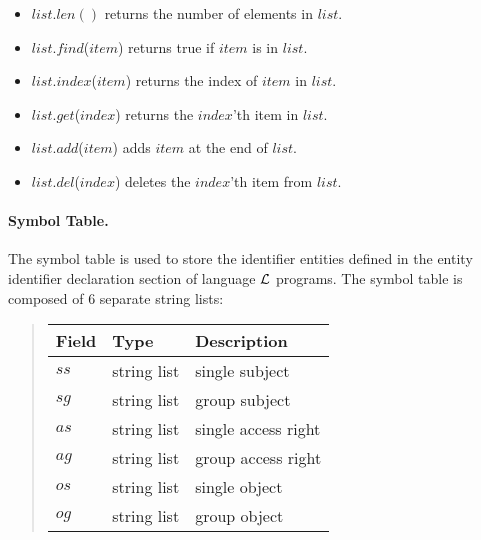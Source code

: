 \documentclass[10pt, twocolumn]{article}
\begin{document}
        \begin{itemize}
          \item
            $list.len()$
            returns the number of elements in $list$.
          \item
            $list$.$find$($item$)
            returns true if $item$ is in $list$.
          \item
            $list$.$index$($item$)
            returns the index of $item$ in $list$.
          \item
            $list$.$get$($index$)
            returns the $index$'th item in $list$.
          \item
            $list$.$add$($item$)
            adds $item$ at the end of $list$.
          \item
            $list$.$del$($index$)
            deletes the $index$'th item from $list$.
        \end{itemize}

        \paragraph{Symbol Table.}

          The symbol table is used to store the identifier entities defined in
          the entity identifier declaration section of language ${\cal L}$
          programs. The symbol table is composed of 6 separate string lists:

          \begin{quote}
            \begin{tabular}[t]{|l|l|l|}
              \hline
              \textbf{Field} & \textbf{Type} & \textbf{Description} \\
              \hline
              $ss$ & string list & single subject \\
              \hline
              $sg$ & string list & group subject \\
              \hline
              $as$ & string list & single access right \\
              \hline
              $ag$ & string list & group access right \\
              \hline
              $os$ & string list & single object \\
              \hline
              $og$ & string list & group object \\
              \hline
            \end{tabular}
          \end{quote}
\end{document}
